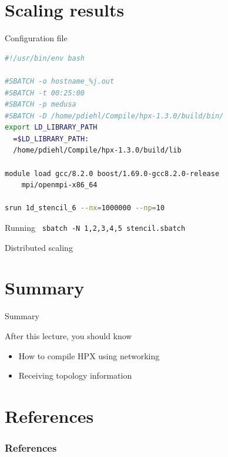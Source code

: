 \documentclass[12pt,t]{beamer}
\begin{document}
\section{Scaling results}

\begin{frame}[fragile]{Configuration file}

\begin{lstlisting}[language=bash]
#!/usr/bin/env bash

#SBATCH -o hostname_%j.out
#SBATCH -t 00:25:00
#SBATCH -p medusa
#SBATCH -D /home/pdiehl/Compile/hpx-1.3.0/build/bin/
export LD_LIBRARY_PATH
  =$LD_LIBRARY_PATH:
  /home/pdiehl/Compile/hpx-1.3.0/build/lib

module load gcc/8.2.0 boost/1.69.0-gcc8.2.0-release 
	mpi/openmpi-x86_64   

srun 1d_stencil_6 --nx=1000000 --np=10 
\end{lstlisting}

\begin{block}{Running}
\lstinline| sbatch -N 1,2,3,4,5 stencil.sbatch|
\end{block}

\end{frame}

\begin{frame}{Distributed scaling}

\begin{center}
\end{center}
\end{frame}

\section{Summary}
\begin{frame}{Summary}
\begin{block}{After this lecture, you should know}
\begin{itemize}
\item How to compile HPX using networking
\item Receiving topology information
\end{itemize}
\end{block}
\end{frame}

\section{References}

\begin{frame}[t, allowframebreaks]
\frametitle{References}


\end{frame}
\end{document}

